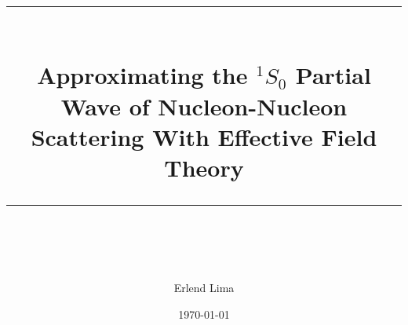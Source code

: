 \newcommand{\horrule}[1]{\rule{\linewidth}{#1}} %

\titlehead{\texttt{[image: Figures/MN\_FYSISK\_Seal\_A\_ENG.pdf]}}
\title{
\horrule{0.5pt} \\[0.4cm]
\huge Approximating the \(^{1}S_{0}\) Partial Wave of Nucleon-Nucleon Scattering With Effective Field Theory

\horrule{0.5pt} \\[0.5cm]}

\author{Erlend Lima}
\date{\today}

\maketitle
